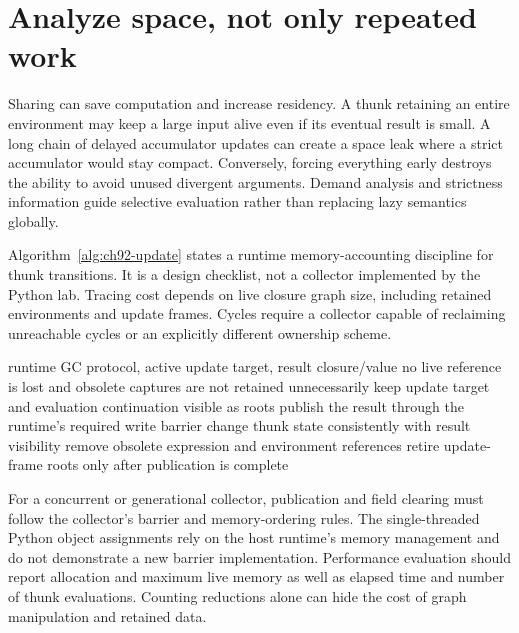 \section{Analyze space, not only repeated work}
\label{sec:ch92-space}
Sharing can save computation and increase residency.
A thunk retaining an entire environment may keep a large input alive even if its eventual result is small.
A long chain of delayed accumulator updates can create a space leak where a strict accumulator would stay compact.
Conversely, forcing everything early destroys the ability to avoid unused divergent arguments.
Demand analysis and strictness information guide selective evaluation rather than replacing lazy semantics globally.

Algorithm~\ref{alg:ch92-update} states a runtime memory-accounting discipline for thunk transitions.
It is a design checklist, not a collector implemented by the Python lab.
Tracing cost depends on live closure graph size, including retained environments and update frames.
Cycles require a collector capable of reclaiming unreachable cycles or an explicitly different ownership scheme.

\begin{algorithm}[htbp]
\caption{Account for roots and obsolete references across a thunk update.}
\label{alg:ch92-update}
\begin{pseudocode}
\Require runtime GC protocol, active update target, result closure/value
\Ensure no live reference is lost and obsolete captures are not retained unnecessarily
\State keep update target and evaluation continuation visible as roots
\State publish the result through the runtime's required write barrier
\State change thunk state consistently with result visibility
\State remove obsolete expression and environment references
\State retire update-frame roots only after publication is complete
\end{pseudocode}
\end{algorithm}

For a concurrent or generational collector, publication and field clearing must follow the collector's barrier and memory-ordering rules.
The single-threaded Python object assignments rely on the host runtime's memory management and do not demonstrate a new barrier implementation.
Performance evaluation should report allocation and maximum live memory as well as elapsed time and number of thunk evaluations.
Counting reductions alone can hide the cost of graph manipulation and retained data.

